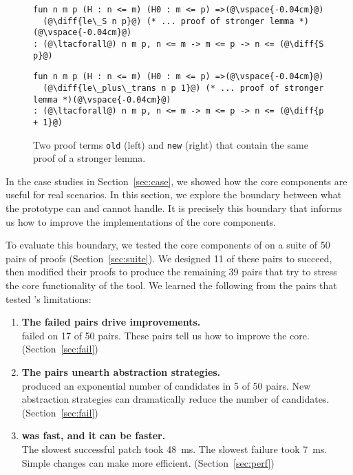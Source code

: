\begin{figure*}[ht]
\begin{minipage}{0.48\textwidth}
\begin{lstlisting}[language=coq]
fun n m p (H : n <= m) (H0 : m <= p) =>(@\vspace{-0.04cm}@)
  (@\diff{le\_S n p}@) (* ... proof of stronger lemma *)(@\vspace{-0.04cm}@)
: (@\ltacforall@) n m p, n <= m -> m <= p -> n <= (@\diff{S p}@)
\end{lstlisting}
\end{minipage}
\hfill
\begin{minipage}{0.48\textwidth}
\begin{lstlisting}[language=coq]
fun n m p (H : n <= m) (H0 : m <= p) =>(@\vspace{-0.04cm}@)
  (@\diff{le\_plus\_trans n p 1}@) (* ... proof of stronger lemma *)(@\vspace{-0.04cm}@)
: (@\ltacforall@) n m p, n <= m -> m <= p -> n <= (@\diff{p + 1}@)
\end{lstlisting}
\end{minipage}
\vspace{-.35cm}
\caption{Two proof terms \lstinline{old} (left) and \lstinline{new} (right) that contain the same proof of a stronger lemma.}
\label{fig:stronger}
\end{figure*}

\lstset{language=coq, aboveskip=3pt,belowskip=3pt}

In the case studies in Section~\ref{sec:case}, we showed how
the core components are useful for real scenarios.
In this section, we explore the boundary between what the \sysname prototype can and cannot handle.
It is precisely this boundary that informs us how to improve the implementations of the
core components.

To evaluate this boundary, we tested the core components of \sysname on a suite of 50 pairs of proofs (Section~\ref{sec:suite}).
We designed 11 of these pairs to succeed, then modified their proofs to produce the remaining 39 pairs
that try to stress the core functionality of the tool.
We learned the following from the pairs
that tested \sysname's limitations:

\begin{enumerate}
\item \textbf{The failed pairs drive improvements.} \\
\sysname failed on 17 of 50 pairs. These pairs tell us how to improve the core. (Section~\ref{sec:fail})
\item \textbf{The pairs unearth abstraction strategies.} \\
\sysname produced an exponential number of candidates in 5 of 50 pairs.
New abstraction strategies can dramatically reduce the number of candidates. (Section~\ref{sec:fail})
\item \textbf{\sysname was fast, and it can be faster.} \\
The slowest successful patch took \SI{48}{\ms}. The slowest failure took \SI{7}{\ms}.
Simple changes can make \sysname more efficient. (Section~\ref{sec:perf})
\end{enumerate}

